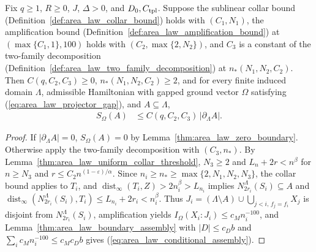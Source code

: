 \begin{lemma}
    \label{thm:area_law_conditional_assembly_constants}
    \leanok
    Fix $q\ge1$, $R\ge0$, $J$, $\Delta>0$, and $D_0,C_{\rm tpl}$. Suppose the sublinear collar
    bound (Definition~\ref{def:area_law_collar_bound}) holds with $(C_1,N_1)$, the amplification bound (Definition~\ref{def:area_law_amplification_bound}) at $(\max\{C_1,1\},100)$ holds with $(C_2,\max\{2,N_2\})$,
    and $C_3$ is a constant of the two-family decomposition (Definition~\ref{def:area_law_two_family_decomposition}) at $n_*(N_1,N_2,C_2)$. Then $C(q,C_2,C_3)\ge0$, $n_*(N_1,N_2,C_2)\ge2$,
    and for every finite induced domain $\Lambda$, admissible Hamiltonian with gapped ground vector $\Omega$ satisfying (\ref{eq:area_law_projector_gap}), and $A\subseteq\Lambda$,
    \begin{align}
        S_\Omega(A) & \le C(q,C_2,C_3)\,|\partial_\Lambda A|.
        \label{eq:area_law_conditional_assembly}
    \end{align}
\end{lemma}
\begin{proof}
    \leanok
    If $|\partial_\Lambda A|=0$, $S_\Omega(A)=0$ by Lemma~\ref{thm:area_law_zero_boundary}. Otherwise apply the two-family decomposition with $(C_3,n_*)$. By Lemma~\ref{thm:area_law_uniform_collar_threshold}, $N_3\ge2$ and $L_n+2r<n^\beta$ for $n\ge N_3$ and $r\le C_2n^{(1-\varepsilon)/\alpha}$. Since $n_i\ge n_*\ge\max\{2,N_1,N_2,N_3\}$, the collar bound applies to $T_i$, and $\operatorname{dist}_\infty(T_i,Z)>2n_i^\beta>L_{n_i}$ implies $N_{2r_i}^\Lambda(S_i)\subseteq A$ and $\operatorname{dist}_\infty(N_{2r_i}^\Lambda(S_i),T_i)\le L_{n_i}+2r_i<n_i^\beta$. Thus $J_i=(\Lambda\setminus A)\cup\bigcup_{j<i,\,f_j=f_i}X_j$ is disjoint from $N_{2r_i}^\Lambda(S_i)$, amplification yields $I_\Omega(X_i:J_i)\le c_Mn_i^{-100}$, and Lemma~\ref{thm:area_law_boundary_assembly} with $|D|\le c_Db$ and $\sum_i c_Mn_i^{-100}\le c_Mc_Db$ gives (\ref{eq:area_law_conditional_assembly}).
\end{proof}

